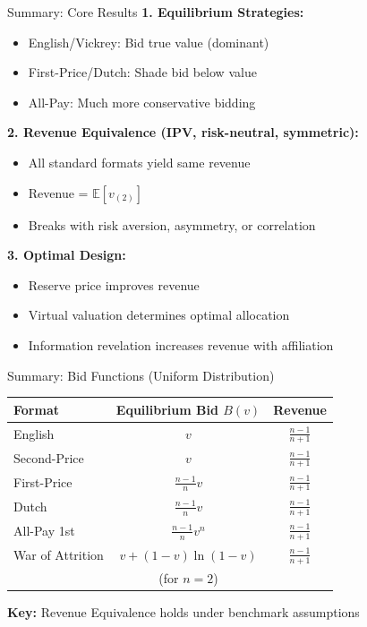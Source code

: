 \documentclass[xcolor={x11names}, aspectratio=169 ]{beamer}
\newcommand{\E}{\mathbb{E}}
\begin{document}
\begin{frame}{Summary: Core Results}
\textbf{1. Equilibrium Strategies:}
\begin{itemize}
  \item English/Vickrey: Bid true value (dominant)
  \item First-Price/Dutch: Shade bid below value
  \item All-Pay: Much more conservative bidding
\end{itemize}

\textbf{2. Revenue Equivalence (IPV, risk-neutral, symmetric):}
\begin{itemize}
  \item All standard formats yield same revenue
  \item Revenue = $\E[v_{(2)}]$
  \item Breaks with risk aversion, asymmetry, or correlation
\end{itemize}

\textbf{3. Optimal Design:}
\begin{itemize}
  \item Reserve price improves revenue
  \item Virtual valuation determines optimal allocation
  \item Information revelation increases revenue with affiliation
\end{itemize}
\end{frame}

\begin{frame}{Summary: Bid Functions (Uniform Distribution)}
\begin{center}
\begin{tabular}{lcc}
\toprule
\textbf{Format} & \textbf{Equilibrium Bid} $B(v)$ & \textbf{Revenue} \\
\midrule
English & $v$ & $\frac{n-1}{n+1}$ \\[0.2cm]
Second-Price & $v$ & $\frac{n-1}{n+1}$ \\[0.2cm]
First-Price & $\frac{n-1}{n}v$ & $\frac{n-1}{n+1}$ \\[0.2cm]
Dutch & $\frac{n-1}{n}v$ & $\frac{n-1}{n+1}$ \\[0.2cm]
All-Pay 1st & $\frac{n-1}{n}v^n$ & $\frac{n-1}{n+1}$ \\[0.2cm]
War of Attrition & $v + (1-v)\ln(1-v)$ & $\frac{n-1}{n+1}$ \\
& (for $n=2$) & \\
\bottomrule
\end{tabular}
\end{center}

\textbf{Key:} Revenue Equivalence holds under benchmark assumptions
\end{frame}
\end{document}
